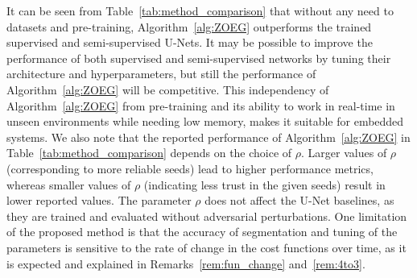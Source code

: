 \documentclass{article}
\theoremstyle{plain}
\theoremstyle{definition}
\theoremstyle{remark}
\begin{document}
It can be seen from Table~\ref{tab:method_comparison} that without any need to datasets and pre-training, Algorithm~\ref{alg:ZOEG} outperforms the trained supervised and semi-supervised U-Nets. It may be possible to improve the performance of both supervised and semi-supervised networks by tuning their architecture and hyperparameters, but still the performance of Algorithm~\ref{alg:ZOEG} will be competitive. This independency of Algorithm~\ref{alg:ZOEG} from pre-training and its ability to work in real-time in unseen environments while needing low memory, makes it suitable for embedded systems. We also note that the reported performance of Algorithm~\ref{alg:ZOEG} in Table~\ref{tab:method_comparison} depends on the choice of $\rho$. Larger values of $\rho$ (corresponding to more reliable seeds) lead to higher performance metrics, whereas smaller values of $\rho$ (indicating less trust in the given seeds) result in lower reported values. The parameter $\rho$ does not affect the U-Net baselines, as they are trained and evaluated without adversarial perturbations. One limitation of the proposed method is that the accuracy of segmentation and tuning of the parameters is sensitive to the rate of change in the cost functions over time, as it is expected and explained in Remarks~\ref{rem:fun_change} and~\ref{rem:4to3}.
\end{document}
